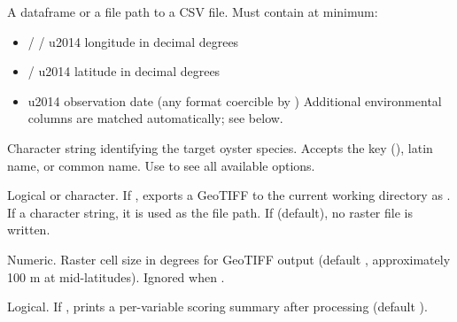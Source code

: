 \documentclass[a4paper]{book}
\begin{document}
%
\begin{Arguments}
\begin{ldescription}
\item[\code{data}] A dataframe or a file path to a CSV file. Must contain at minimum:
\begin{itemize}

\item{}  /  /  \bsl{}u2014 longitude in decimal degrees
\item{}  /  \bsl{}u2014 latitude in decimal degrees
\item{}  \bsl{}u2014 observation date (any format coercible by )
Additional environmental columns are matched automatically; see
 below.

\end{itemize}


\item[\code{species}] Character string identifying the target oyster species.
Accepts the key (), latin name, or common name.
Use  to see all available options.

\item[\code{output\_geotiff}] Logical or character. If , exports a GeoTIFF to
the current working directory as . If a
character string, it is used as the file path. If  (default), no
raster file is written.

\item[\code{resolution}] Numeric. Raster cell size in degrees for GeoTIFF output
(default , approximately 100 m at mid-latitudes). Ignored when
.

\item[\code{verbose}] Logical. If , prints a per-variable scoring summary
after processing (default ).
\end{ldescription}
\end{Arguments}
%
\end{document}
